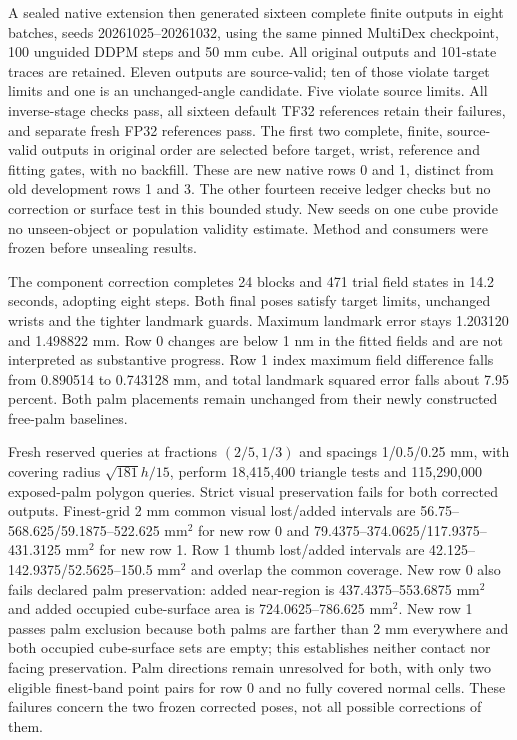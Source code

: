 \documentclass[10pt,letterpaper]{article}
\begin{document}
A sealed native extension then generated sixteen complete finite outputs in
eight batches, seeds 20261025--20261032, using the same pinned MultiDex
checkpoint, 100 unguided DDPM steps and 50 mm cube. All original outputs and
101-state traces are retained. Eleven outputs are source-valid; ten of those
violate target limits and one is an unchanged-angle candidate. Five violate
source limits. All inverse-stage checks pass, all sixteen default TF32
references retain their failures, and separate fresh FP32 references pass.
The first two complete, finite, source-valid outputs in original order are
selected before target, wrist, reference and fitting gates, with no backfill.
These are new native rows 0 and 1, distinct from old development rows 1 and 3.
The other fourteen receive ledger checks but no correction or surface test in
this bounded study. New seeds on one cube provide no unseen-object or population
validity estimate. Method and consumers were frozen before unsealing results.

The component correction completes 24 blocks and 471 trial field states in
14.2 seconds, adopting eight steps. Both final poses satisfy target limits,
unchanged wrists and the tighter landmark guards. Maximum landmark error stays
1.203120 and 1.498822 mm. Row 0 changes are below 1 nm in the fitted fields and
are not interpreted as substantive progress. Row 1 index maximum field
difference falls from 0.890514 to 0.743128 mm, and total landmark squared error
falls about 7.95 percent. Both palm placements remain unchanged from their
newly constructed free-palm baselines.

Fresh reserved queries at fractions $(2/5,1/3)$ and spacings 1/0.5/0.25 mm,
with covering radius $\sqrt{181}h/15$, perform 18,415,400 triangle tests and
115,290,000 exposed-palm polygon queries. Strict visual preservation fails for
both corrected outputs. Finest-grid 2 mm common visual lost/added intervals
are 56.75--568.625/59.1875--522.625 mm$^2$ for new row 0 and
79.4375--374.0625/117.9375--431.3125 mm$^2$ for new row 1. Row 1 thumb
lost/added intervals are 42.125--142.9375/52.5625--150.5 mm$^2$ and overlap
the common coverage. New row 0 also fails declared palm preservation:
added near-region is 437.4375--553.6875 mm$^2$ and added occupied cube-surface
area is 724.0625--786.625 mm$^2$. New row 1 passes palm exclusion because both
palms are farther than 2 mm everywhere and both occupied cube-surface sets are empty;
this establishes neither contact nor facing preservation. Palm directions
remain unresolved for both, with only two eligible finest-band point pairs
for row 0 and no fully covered normal cells. These failures concern the two
frozen corrected poses, not all possible corrections of them.
\end{document}
